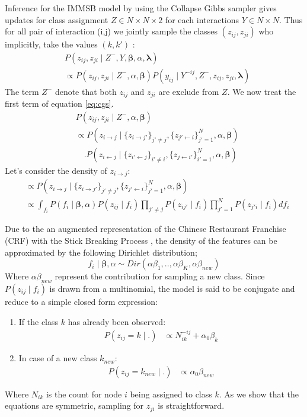 \documentclass{llncs}
\newcommand{\pr}{P}
\newcommand{\mat}[1]{\mathbf{#1}}
\begin{document}
Inference for the IMMSB model by using the Collapse Gibbs sampler gives updates for class assignment $Z \in N\times N \times 2$ for each interactions $Y \in N\times N$. Thus for all pair of interaction (i,j) we jointly sample the classes $(z_{ij}, z_{ji})$ who implicitly, take the values $(k,k')$ :
\begin{align} \label{eq:cgs}
&\pr(z_{ij}, z_{ji} \mid Z^-, Y,  \mat{\beta}, \alpha, \mat{\lambda} )  \\
&\propto\pr(z_{ij}, z_{ji} \mid Z^-, \alpha,\mat{\beta}) \pr(y_{ij} \mid Y^{-ij},  Z^-,z_{ij}, z_{ji},  \mat{\lambda} ) \nonumber
\end{align}
The term $Z^-$ denote that both $z_{ij}$ and $z_{ji}$ are exclude from $Z$. We now treat the first term of equation \ref{eq:cgs}.  
\begin{align}
&\pr(z_{ij}, z_{ji} \mid Z^-, \alpha,\mat{\beta})\\
&\propto \pr(z_{i\rightarrow j} \mid \{z_{i\rightarrow j'}\}_{j'\neq j}, \{z_{j'\leftarrow i}\}_{j'=1}^N, \alpha,\mat{\beta}) \\
& \quad .  \pr(z_{i\leftarrow j} \mid \{z_{i'\leftarrow j}\}_{i'\neq i}, \{z_{j\leftarrow i'}\}_{i'=1}^N, \alpha,\mat{\beta}) \nonumber
\end{align}
Let's consider the density of $z_{i\rightarrow j}$:
\begin{align}
&\propto \pr(z_{i\rightarrow j} \mid \{z_{i\rightarrow j'}\}_{j'\neq j}, \{z_{j'\leftarrow i}\}_{j'=1}^N, \alpha,\mat{\beta})  \\
&\propto \int_{f_i} \pr(f_i \mid \mat{\beta}, \alpha) \pr(z_{ij} \mid f_i) \prod_{j'\neq j} \pr(z_{ij'} \mid f_i) \prod_{j' =  1}^N  \pr(z_{j' i} \mid f_i)  df_i \nonumber
\end{align}


Due to the an augmented representation of the Chinese Restaurant Franchise (CRF) with the Stick Breaking Process \cite{HDP}, the density of the features can be approximated by the following Dirichlet distribution;
\begin{equation}
f_i \mid \mat{\beta}, \alpha \sim Dir(\alpha \beta_1,..,\alpha\beta_K, \alpha\beta_{new})
\end{equation}
Where $\alpha\beta_{new}$ represent the contribution for sampling a new class. Since $\pr(z_{ij} \mid f_i)$ is drawn from a multinomial, the model is said to be conjugate and reduce to a simple closed form expression:
\begin{enumerate}
	\item If the class $k$ has already been observed:
	\begin{align}
	\pr(z_{ij} =k \mid .) &\propto N_{ik}^{-ij} + \alpha_0 \beta_k
	\label{eq:update-immsb}
	\end{align}
	\item In case of a new class $k_{new}$:
	\begin{align}
	\pr(z_{ij} =k_{new} \mid.) &\propto \alpha_0 \beta_{new} \nonumber   
	\end{align}
\end{enumerate}
Where  $N_{ik}$ is the count for node $i$ being assigned to class $k$. As we show that the equations are symmetric, sampling for $z_{ji}$ is straightforward.
\end{document}
